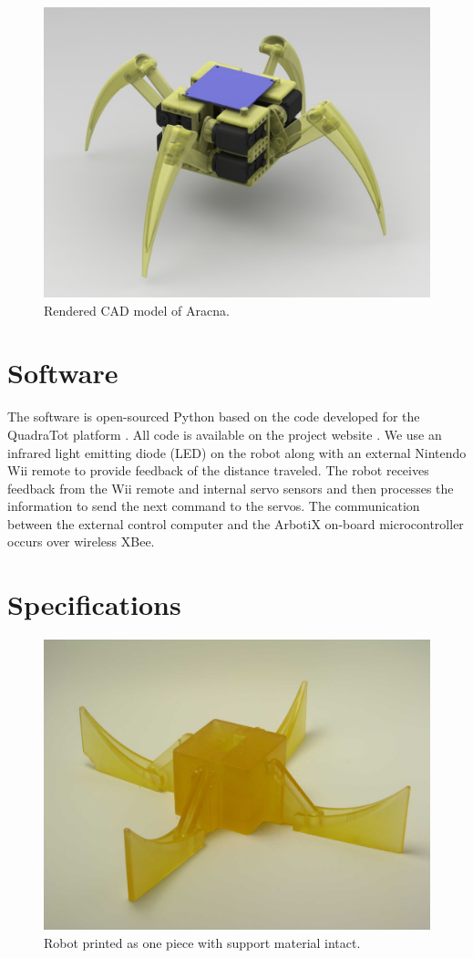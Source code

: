 \documentclass[letterpaper]{article}
\begin{document}
\begin{figure}[t]
\begin{center}
\includegraphics[width=\columnwidth]{fig5.jpg}
\caption{Rendered CAD model of Aracna.}
\label{fi52}
\end{center}
\end{figure}



\section{Software}

The software is open-sourced Python based on the
code developed for the QuadraTot platform \citep{JY}. All code is
available on the project website \citep{WEB}. We use an infrared light
emitting diode (LED) on the robot along with an external Nintendo Wii
remote to provide feedback of the distance traveled. The robot
receives feedback from the Wii remote and internal servo sensors and
then processes the information to send the next command to
the servos. The communication between the external control computer
and the ArbotiX on-board microcontroller occurs over wireless XBee.



\section{Specifications}

\begin{figure}[t]
\begin{center}
\includegraphics[width=.37\textwidth]{fig2.jpg}
\caption{Robot printed as one piece with support material intact.}
\label{fig2}
\end{center}
\end{figure}
\end{document}
